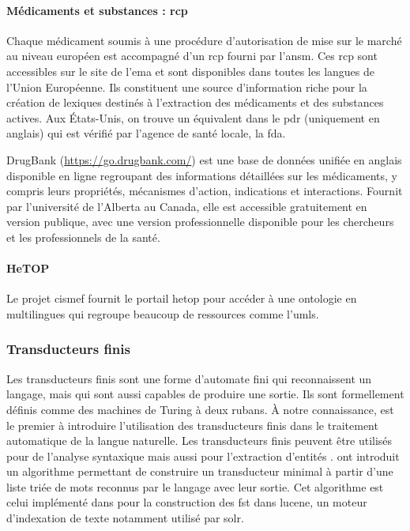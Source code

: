 \paragraph{Médicaments et substances : \gls*{rcp}}
Chaque médicament soumis à une procédure d'autorisation de mise sur le marché au niveau européen est accompagné d'un \gls{rcp} fourni par l'\gls{ansm}.
Ces \gls{rcp} sont accessibles sur le site de l'\gls{ema} et sont disponibles dans toutes les langues de l'Union Européenne.
Ils constituent une source d'information riche pour la création de lexiques destinés à l'extraction des médicaments et des substances actives.
Aux États-Unis, on trouve un équivalent dans le \gls{pdr} (uniquement en anglais) qui est vérifié par l'agence de santé locale, la \gls{fda}.

DrugBank \cite{wishartDrugBankKnowledgebaseDrugs2008,wishartDrugBankMajorUpdate2018} (\url{https://go.drugbank.com/}) est une base de données unifiée en anglais disponible en ligne regroupant des informations détaillées sur les médicaments, y compris leurs propriétés, mécanismes d'action, indications et interactions.
Fournit par l'université de l'Alberta au Canada, elle est accessible gratuitement en version publique, avec une version professionnelle disponible pour les chercheurs et les professionnels de la santé.

\paragraph{HeTOP}
Le projet \gls{cismef} fournit le portail \gls{hetop} pour accéder à une ontologie en multilingues qui regroupe beaucoup de ressources comme l'\gls{umls}.

\subsubsection{Transducteurs finis}

Les transducteurs finis sont une forme d'automate fini qui reconnaissent un langage, mais qui sont aussi capables de produire une sortie.
Ils sont formellement définis comme des machines de Turing à deux rubans.
À notre connaissance, \cite{grossUseFiniteAutomata1989} est le premier à introduire l'utilisation des transducteurs finis dans le traitement automatique de la langue naturelle.
Les transducteurs finis peuvent être utilisés pour de l'analyse syntaxique \cite{briscoeRobustAccurateStatistical2002} mais aussi pour l'extraction d'entités \cite{gaioExtendedNamedEntity2017}.
\cite{mihovDirectConstructionMinimal2001} ont introduit un algorithme permettant de construire un transducteur minimal à partir d'une liste triée de mots reconnus par le langage avec leur sortie.
Cet algorithme est celui implémenté dans pour la construction des \gls{fst} dans \gls{lucene}, un moteur d'indexation de texte notamment utilisé par \gls{solr}.

